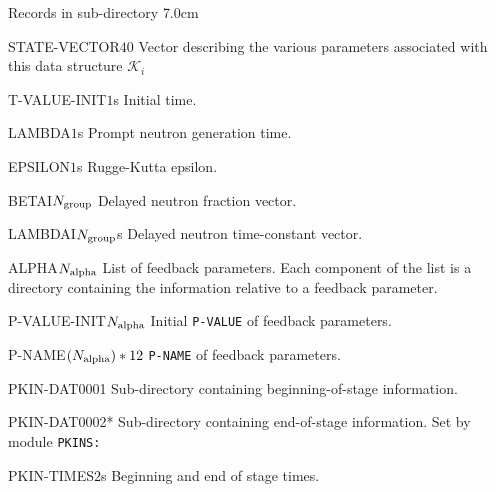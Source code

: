 \begin{DescriptionEnregistrement}{Records in  sub-directory}
{7.0cm} \label{tabl:tabpkinetics}

\IntEnr
  {STATE-VECTOR}{$40$}
  {Vector describing the various parameters associated with this data structure $\mathcal{K}_i$}

\RealEnr
 {T-VALUE-INIT}{$1$}{s} {Initial time.}

\RealEnr
 {LAMBDA}{$1$}{s} {Prompt neutron generation time.}

\RealEnr
 {EPSILON}{$1$}{s} {Rugge-Kutta epsilon.}

\RealEnr
 {BETAI}{$N_{\rm group}$}{} {Delayed neutron fraction vector.}

\RealEnr
 {LAMBDAI}{$N_{\rm group}$}{s} {Delayed neutron time-constant vector.}

\DirlEnr
  {ALPHA}{$N_{\rm alpha}$}
  {List of feedback parameters. Each component of the list is a directory containing
   the information relative to a feedback parameter.}

\RealEnr
 {P-VALUE-INIT}{$N_{\rm alpha}$}{}
 {Initial {\tt P-VALUE} of feedback parameters.}

\CharEnr
 {P-NAME}{$(N_{\rm alpha})*12$} {{\tt P-NAME} of feedback parameters.}
          
\DirEnr
 {PKIN-DAT0001}
 {Sub-directory containing beginning-of-stage information.}
          
\OptDirEnr
 {PKIN-DAT0002}{*}
 {Sub-directory containing end-of-stage information. Set by module {\tt PKINS:}}

\RealEnr
 {PKIN-TIMES}{$2$}{s} {Beginning and end of stage times.}

\end{DescriptionEnregistrement}

\clearpage
